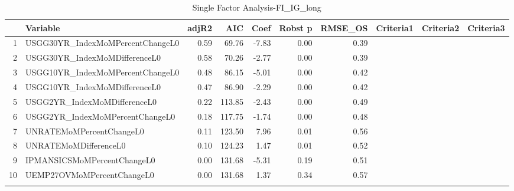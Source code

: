\begin{longtable}{rlrrrrrlll}
  \hline
 & Variable & adjR2 & AIC & Coef & Robst p & RMSE\_OS & Criteria1 & Criteria2 & Criteria3 \\ 
  \hline
1 & USGG30YR\_IndexMoMPercentChangeL0 & 0.59 & 69.76 & -7.83 & 0.00 & 0.39 &  &  &  \\ 
  2 & USGG30YR\_IndexMoMDifferenceL0 & 0.58 & 70.26 & -2.77 & 0.00 & 0.39 &  &  &  \\ 
  3 & USGG10YR\_IndexMoMPercentChangeL0 & 0.48 & 86.15 & -5.01 & 0.00 & 0.42 &  &  &  \\ 
  4 & USGG10YR\_IndexMoMDifferenceL0 & 0.47 & 86.90 & -2.29 & 0.00 & 0.42 &  &  &  \\ 
  5 & USGG2YR\_IndexMoMDifferenceL0 & 0.22 & 113.85 & -2.43 & 0.00 & 0.49 &  &  &  \\ 
  6 & USGG2YR\_IndexMoMPercentChangeL0 & 0.18 & 117.75 & -1.74 & 0.00 & 0.48 &  &  &  \\ 
  7 & UNRATEMoMPercentChangeL0 & 0.11 & 123.50 & 7.96 & 0.01 & 0.56 &  &  &  \\ 
  8 & UNRATEMoMDifferenceL0 & 0.10 & 124.23 & 1.47 & 0.01 & 0.52 &  &  &  \\ 
  9 & IPMANSICSMoMPercentChangeL0 & 0.00 & 131.68 & -5.31 & 0.19 & 0.51 &  &  &  \\ 
  10 & UEMP27OVMoMPercentChangeL0 & 0.00 & 131.68 & 1.37 & 0.34 & 0.57 &  &  &  \\ 
   \hline
\hline
\caption{Single Factor Analysis-FI_IG_long} 
\end{longtable}
